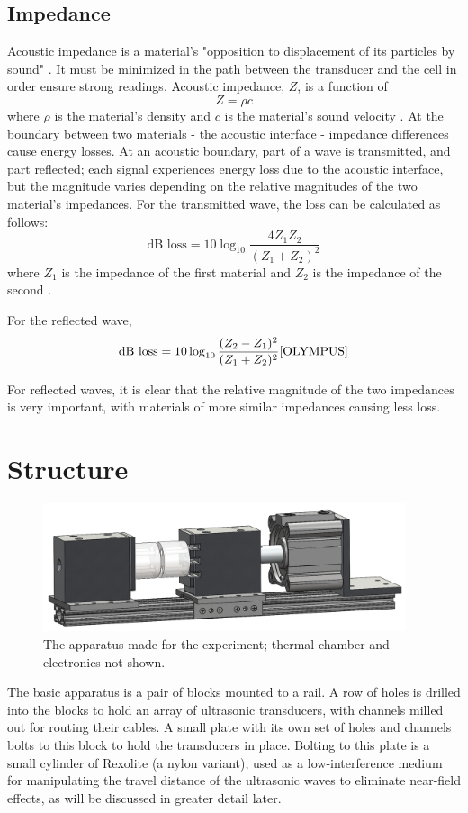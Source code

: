 \subsection{Impedance}
Acoustic impedance is a material's "opposition to displacement of its particles by sound" \cite{OLYMPUS}. It must be minimized in the path between the transducer and the cell in order ensure strong readings. Acoustic impedance, $Z$, is a function of
$$ Z = \rho c$$
where $\rho$ is the material's density and $c$ is the material's sound velocity \cite{OLYMPUS}.
At the boundary between two materials - the acoustic interface - impedance differences cause energy losses. At an acoustic boundary, part of a wave is transmitted, and part reflected; each signal experiences energy loss due to the acoustic interface, but the magnitude varies depending on the relative magnitudes of the two material's impedances.
For the transmitted wave, the loss can be calculated as follows:
$$ \text{dB loss} = 10 \log_{10} \frac{4Z_1 Z_2}{(Z_1 + Z_2)^2}$$
where $Z_1$ is the impedance of the first material and $Z_2$ is the impedance of the second \cite{OLYMPUS}.

For the reflected wave, 
$$\text{dB loss} = 10\log_{10} \frac{(Z_2 - Z_1)^2}{(Z_1 + Z_2)^2} \cite{OLYMPUS}$$

For reflected waves, it is clear that the relative magnitude of the two impedances is very important, with materials of more similar impedances causing less loss.

\section{Structure}
\begin{figure}[t]\label{fig:unexploded}
    \includegraphics[width=0.95\textwidth]{Thesis/unexploded.PNG}
    \centering
    \caption{The apparatus made for the experiment; thermal chamber and electronics not shown.}
\end{figure}

The basic apparatus is a pair of blocks mounted to a rail. A row of holes is drilled into the blocks to hold an array of ultrasonic transducers, with channels milled out for routing their cables. A small plate with its own set of holes and channels bolts to this block to hold the transducers in place. Bolting to this plate is a small cylinder of Rexolite (a nylon variant), used as a low-interference medium for manipulating the travel distance of the ultrasonic waves to eliminate near-field effects, as will be discussed in greater detail later.

